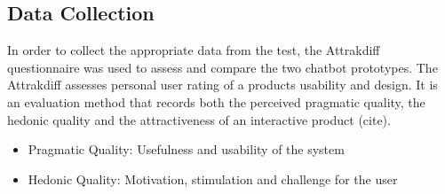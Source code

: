     \vspace{5mm} %
    
    \subsection{Data Collection}
    
    In order to collect the appropriate data from the test, the Attrakdiff questionnaire was used to assess and compare the two chatbot prototypes. The Attrakdiff assesses personal user rating of a products usability and design. It is an evaluation method that records both the perceived pragmatic quality, the hedonic quality and the attractiveness of an interactive product (cite).
    
    \begin{itemize}
        \item Pragmatic Quality: Usefulness and usability of the system
        \item Hedonic Quality: Motivation, stimulation and challenge for the user
    \end{itemize}
